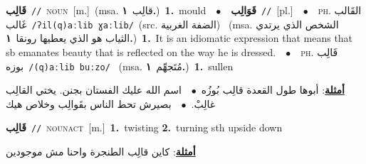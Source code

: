 \documentclass[10pt,a4paper,twoside]{article} %
\begin{document}
\begin{multicols}{2}
{\setlength\topsep{0pt}\textbf{\foreignlanguage{arabic}{قَالِب}}\ {\color{gray}\texttt{//}\color{black}}\ \textsc{noun}\ [m.]\ \color{gray}(msa. \foreignlanguage{arabic}{قالِب}~\foreignlanguage{arabic}{\textbf{١.}})\color{black}\ \textbf{1.}~mould\ \ $\bullet$\ \ \setlength\topsep{0pt}\textbf{\foreignlanguage{arabic}{قَوَالِب}}\ {\color{gray}\texttt{//}\color{black}}\ [pl.]\ \ $\bullet$\ \ \textsc{ph.} \color{gray} \foreignlanguage{arabic}{القَالب غَالب}\color{black}\ {\color{gray}\texttt{/{\sffamily ʔil(q)aːlib ɣaːlib}/}\color{black}}\ \color{gray}(src. \foreignlanguage{arabic}{الضفة الغربية})\color{black}\ \color{gray} (msa. \foreignlanguage{arabic}{الشخص الذي يرتدي الثياب هو الذي يعطيها رونقا}~\foreignlanguage{arabic}{\textbf{١.}})\color{black}\ \textbf{1.}~It is an idiomatic expression that means that sb emanates beauty that is reflected on the way he is dressed.\ \ $\bullet$\ \ \textsc{ph.} \color{gray} \foreignlanguage{arabic}{قَالِب بوزه}\color{black}\ {\color{gray}\texttt{/{\sffamily (q)aːlib buːzo}/}\color{black}}\ \color{gray} (msa. \foreignlanguage{arabic}{مُتَجهِّم}~\foreignlanguage{arabic}{\textbf{١.}})\color{black}\ \textbf{1.}~sullen\  \begin{flushright}\color{gray}\foreignlanguage{arabic}{\textbf{\underline{\foreignlanguage{arabic}{أمثلة}}}: أبوها طول القعدة قالِب بُوزُه\ $\bullet$\ \  اسم الله عليك الفستان بجنن. يختي القالِب غالِبْ.\ $\bullet$\ \  بصيرش تحط الناس بقَوالِب وخلاص هيك}\end{flushright}\color{black}} \vspace{2mm}

{\setlength\topsep{0pt}\textbf{\foreignlanguage{arabic}{قَالِب}}\ {\color{gray}\texttt{//}\color{black}}\ \textsc{noun\textunderscore act}\ [m.]\ \textbf{1.}~twisting  \textbf{2.}~turning sth upside down\  \begin{flushright}\color{gray}\foreignlanguage{arabic}{\textbf{\underline{\foreignlanguage{arabic}{أمثلة}}}: كاين قالِب الطنجرة واحنا مش موجودين}\end{flushright}\color{black}} \vspace{2mm}


\end{multicols}
\end{document}
